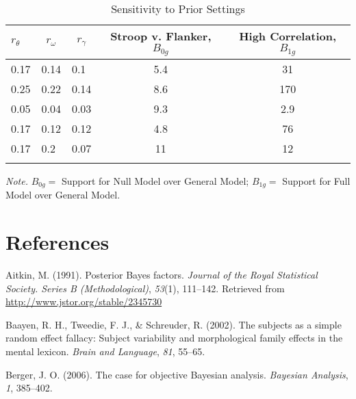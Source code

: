 \documentclass[english,man]{apa6}
\theoremstyle{definition}
\theoremstyle{definition}
\theoremstyle{definition}
\theoremstyle{remark}
\begin{document}
\begin{table}[tbp]
\begin{center}
\begin{threeparttable}
\caption{\label{tab:sens}Sensitivity to Prior Settings}
\begin{tabular}{lllcc}
\toprule
$r_\theta$ & \multicolumn{1}{c}{$r_\omega$} & \multicolumn{1}{c}{$r_\gamma$} & \multicolumn{1}{c}{Stroop v. Flanker, $B_{0g}$} & \multicolumn{1}{c}{High Correlation, $B_{1g}$}\\
\midrule
0.17 & 0.14 & 0.1 & 5.4 & 31\\
0.25 & 0.22 & 0.14 & 8.6 & 170\\
0.05 & 0.04 & 0.03 & 9.3 & 2.9\\
0.17 & 0.12 & 0.12 & 4.8 & 76\\
0.17 & 0.2 & 0.07 & 11 & 12\\
\bottomrule
\addlinespace
\end{tabular}
\begin{tablenotes}[para]
\textit{Note.} $B_{0g}=$ Support for Null Model over General Model; $B_{1g}=$ Support for Full Model over General Model.
\end{tablenotes}
\end{threeparttable}
\end{center}
\end{table}

\newpage

\section{References}\label{references}

\begingroup
\setlength{\parindent}{-0.5in} \setlength{\leftskip}{0.5in}

\hypertarget{refs}{}
\hypertarget{ref-Aitkin:1991}{}
Aitkin, M. (1991). Posterior Bayes factors. \emph{Journal of the Royal
Statistical Society. Series B (Methodological)}, \emph{53}(1), 111--142.
Retrieved from \url{http://www.jstor.org/stable/2345730}

\hypertarget{ref-Baayen:etal:2002}{}
Baayen, R. H., Tweedie, F. J., \& Schreuder, R. (2002). The subjects as
a simple random effect fallacy: Subject variability and morphological
family effects in the mental lexicon. \emph{Brain and Language},
\emph{81}, 55--65.

\hypertarget{ref-Berger:2006}{}
Berger, J. O. (2006). The case for objective Bayesian analysis.
\emph{Bayesian Analysis}, \emph{1}, 385--402.
\end{document}
